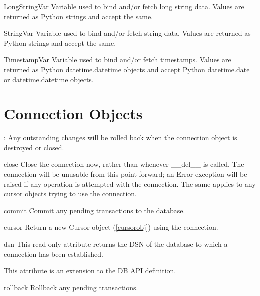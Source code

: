 \documentclass{manual}
\begin{document}
\begin{datadesc}{LongStringVar}
  Variable used to bind and/or fetch long string data. Values are returned as
  Python strings and accept the same.
\end{datadesc}

\begin{datadesc}{StringVar}
  Variable used to bind and/or fetch string data. Values are returned as Python
  strings and accept the same.
\end{datadesc}

\begin{datadesc}{TimestampVar}
  Variable used to bind and/or fetch timestamps. Values are returned as Python
  datetime.datetime objects and accept Python datetime.date or
  datetime.datetime objects.
\end{datadesc}

\chapter{Connection Objects\label{connobj}}

: Any outstanding changes will be rolled back when the connection
object is destroyed or closed.

\begin{funcdesc}{close}{}
  Close the connection now, rather than whenever __del__ is called. The
  connection will be unusable from this point forward; an Error exception will
  be raised if any operation is attempted with the connection. The same applies
  to any cursor objects trying to use the connection.
\end{funcdesc}

\begin{funcdesc}{commit}{}
  Commit any pending transactions to the database.
\end{funcdesc}

\begin{funcdesc}{cursor}{}
  Return a new Cursor object (\ref{cursorobj}) using the connection.
\end{funcdesc}

\begin{datadesc}{dsn}
  This read-only attribute returns the DSN of the database to which a
  connection has been established.

   This attribute is an extension to the DB API definition.
\end{datadesc}

\begin{funcdesc}{rollback}{}
  Rollback any pending transactions.
\end{funcdesc}
\end{document}
